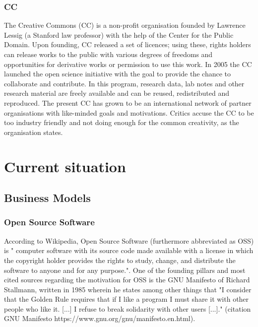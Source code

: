 \documentclass[a4paper]{report}
\begin{document}
\subsection{CC}
\label{sec:CC}
The Creative Commons (CC) is a non-profit organisation founded by Lawrence Lessig (a Stanford law professor) with the help of the Center for the Public Domain. Upon founding, CC released a set of licences; using these, rights holders can release works to the public with various degrees of freedoms and opportunities for derivative works or permission to use this work.
In 2005 the CC launched the open science initiative with the goal to provide the chance to collaborate and contribute. In this program, research data, lab notes and other research material are freely available and can be reused, redistributed and reproduced.
The present CC has grown to be an international network of partner organisations with like-minded goals and motivations. \parencite{Plotkin2002} \parencite{CC2016}
Critics accuse the CC to be too industry friendly and not doing enough for the common creativity, as the organisation states. \parencite{Berry2005}

\chapter{Current situation}
\label{ch:CurrSit}

\section{Business Models}
\label{sec:BusMods}

\subsection{Open Source Software}
\label{ssec:OSS}
According to Wikipedia, Open Source Software (furthermore abbreviated as OSS) is " computer software with its source code made available with a license in which the copyright holder provides the rights to study, change, and distribute the software to anyone and for any purpose."\parencite{WikiOSS}. One of the founding pillars and most cited sources regarding the motivation for OSS is the GNU Manifesto of Richard Stallmann, written in 1985 wherein he states among other things that "I consider that the Golden Rule requires that if I like a program I must share it with other people who like it. [...] I refuse to break solidarity with other users [...]." (citation GNU Manifesto https://www.gnu.org/gnu/manifesto.en.html).
\end{document}
